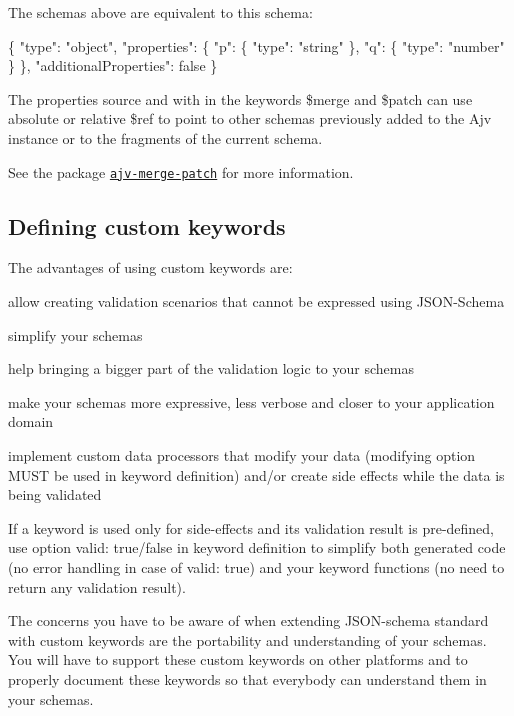 The schemas above are equivalent to this schema\+:


\begin{DoxyCode}
\{
  "type": "object",
  "properties": \{
    "p": \{ "type": "string" \},
    "q": \{ "type": "number" \}
  \},
  "additionalProperties": false
\}
\end{DoxyCode}


The properties {\ttfamily source} and {\ttfamily with} in the keywords {\ttfamily \$merge} and {\ttfamily \$patch} can use absolute or relative {\ttfamily \$ref} to point to other schemas previously added to the Ajv instance or to the fragments of the current schema.

See the package \href{https://github.com/epoberezkin/ajv-merge-patch}{\tt ajv-\/merge-\/patch} for more information.

\subsection*{Defining custom keywords}

The advantages of using custom keywords are\+:


\begin{DoxyItemize}
\item allow creating validation scenarios that cannot be expressed using J\+S\+O\+N-\/\+Schema
\item simplify your schemas
\item help bringing a bigger part of the validation logic to your schemas
\item make your schemas more expressive, less verbose and closer to your application domain
\item implement custom data processors that modify your data ({\ttfamily modifying} option M\+U\+ST be used in keyword definition) and/or create side effects while the data is being validated
\end{DoxyItemize}

If a keyword is used only for side-\/effects and its validation result is pre-\/defined, use option {\ttfamily valid\+: true/false} in keyword definition to simplify both generated code (no error handling in case of {\ttfamily valid\+: true}) and your keyword functions (no need to return any validation result).

The concerns you have to be aware of when extending J\+S\+O\+N-\/schema standard with custom keywords are the portability and understanding of your schemas. You will have to support these custom keywords on other platforms and to properly document these keywords so that everybody can understand them in your schemas.

